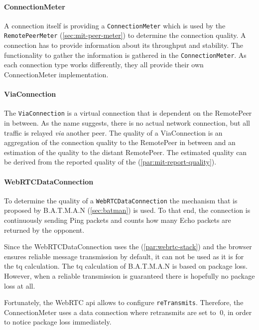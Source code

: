\paragraph{ConnectionMeter}\label{par:mit-connection-meter}
A connection itself is providing a \lstinline|ConnectionMeter| which is used by the \lstinline|RemotePeerMeter| (\vref{sec:mit-peer-meter}) to determine the connection quality. A connection has to provide information about its throughput and stability. The functionality to gather the information is gathered in the \lstinline|ConnectionMeter|. As each connection type works differently, they all provide their own ConnectionMeter implementation.

\paragraph{ViaConnection}\label{par:mit-via-connection}
The \lstinline|ViaConnection| is a virtual connection that is dependent on the RemotePeer in between. As the name suggests, there is no actual network connection, but all traffic is relayed \textit{via} another peer. The quality of a ViaConnection is an aggregation of the connection quality to the RemotePeer in between and an estimation of the quality to the distant RemotePeer. The estimated quality can be derived from the reported quality of the \peerUpdate (\vref{par:mit-report-quality}).

\paragraph{WebRTCDataConnection} \label{par:webrtc-data-measure-quality}
To determine the quality of a \lstinline|WebRTCDataConnection| the  mechanism that is proposed by B.A.T.M.A.N (\vref{sec:batman}) is used. To that end, the connection is continuously sending Ping packets and counts how many Echo packets are returned by the opponent. 

Since the WebRTCDataConnection uses the  (\vref{par:webrtc-stack}) and the browser ensures reliable message transmission by default, it can not be used as it is for the \gls{tq} calculation. The \gls{tq} calculation of B.A.T.M.A.N is based on package loss. However, when a reliable transmission is guaranteed there is hopefully no package loss at all.

Fortunately, the WebRTC \gls{api} allows to configure \lstinline|reTransmits|. Therefore, the ConnectionMeter uses a data connection where retransmits are set to $\ 0 $, in order to notice package loss immediately.

